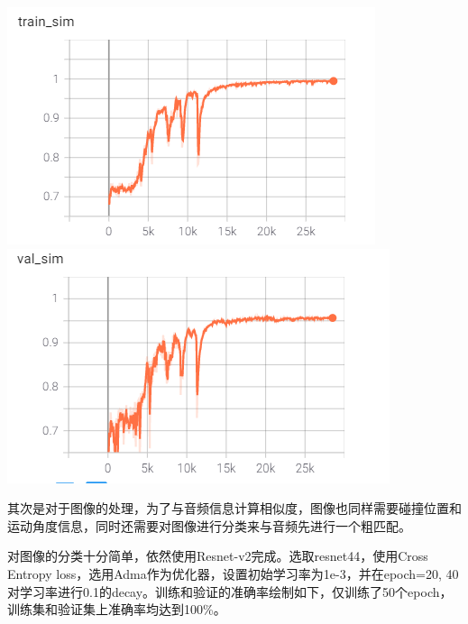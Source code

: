 \documentclass[a4paper]{ctexart}
\begin{document}
\centerline{\includegraphics[scale=0.65]{images/angle_train.png}\includegraphics[scale=0.65]{images/angle_val.png}}

其次是对于图像的处理，为了与音频信息计算相似度，图像也同样需要碰撞位置和运动角度信息，同时还需要对图像进行分类来与音频先进行一个粗匹配。

对图像的分类十分简单，依然使用Resnet-v2完成。选取resnet44，使用Cross Entropy loss，选用Adma作为优化器，设置初始学习率为1e-3，并在epoch=20, 40对学习率进行0.1的decay。训练和验证的准确率绘制如下，仅训练了50个epoch，训练集和验证集上准确率均达到100\%。
\end{document}
